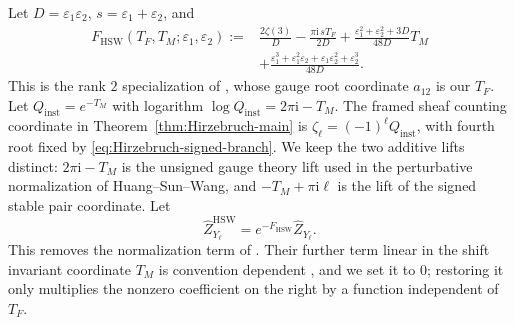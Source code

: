 \documentclass{amsart}
\theoremstyle{definition}
\numberwithin{equation}{section}
\newcommand{\eps}{\varepsilon}
\begin{document}
Let \(D=\eps_1\eps_2\), \(s=\eps_1+\eps_2\), and
\begin{equation}
\begin{aligned}
 F_{\mathrm{HSW}}(T_F,T_M;\eps_1,\eps_2)
 :={}&\frac{2\zeta(3)}D-
 \frac{\pi\mathrm{i}\,sT_F}{2D}
 +\frac{\eps_1^2+\eps_2^2+3D}{48D}T_M\\
 &+\frac{\eps_1^3+\eps_1^2\eps_2+
          \eps_1\eps_2^2+\eps_2^3}{48D}.
\end{aligned}
\label{eq:Hirzebruch-HSW-exponent}
\end{equation}
This is the rank \(2\) specialization of \cite[equation~(3.120)]{HuangSunWang}, whose gauge root coordinate \(a_{12}\) is our \(T_F\).  Let \(Q_{\mathrm{inst}}=e^{-T_M}\) with logarithm \(\log Q_{\mathrm{inst}}=2\pi\mathrm{i}-T_M\).  The framed sheaf counting coordinate in Theorem~\ref{thm:Hirzebruch-main} is \(\zeta_\ell=(-1)^\ell Q_{\mathrm{inst}}\), with fourth root fixed by \eqref{eq:Hirzebruch-signed-branch}.  We keep the two additive lifts distinct: \(2\pi\mathrm{i}-T_M\) is the unsigned gauge theory lift used in the perturbative normalization of Huang--Sun--Wang, and \(-T_M+\pi\mathrm{i}\ell\) is the lift of the signed stable pair coordinate.  Let
\[
 \widehat Z_{Y_\ell}^{\mathrm{HSW}}
 =e^{-F_{\mathrm{HSW}}}\widehat Z_{Y_\ell}.
\]
This removes the normalization term of \cite[equations~(3.118)--(3.120)]{HuangSunWang}.  Their further term linear in the shift invariant coordinate \(T_M\) is convention dependent \cite[equation~(3.124)]{HuangSunWang}, and we set it to \(0\); restoring it only multiplies the nonzero coefficient on the right by a function independent of \(T_F\).
\end{document}
